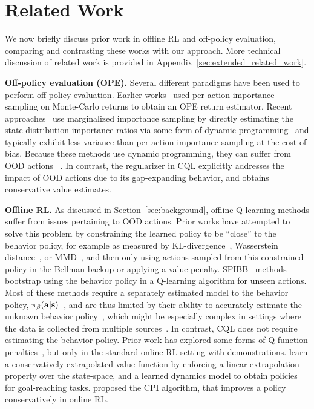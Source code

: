 \vspace{-8pt}
\section{Related Work}
\label{sec:related}
\vspace{-8pt}
We now briefly discuss prior work in offline RL and off-policy evaluation, comparing and contrasting these works with our approach. More technical discussion of related work is provided in Appendix~\ref{sec:extended_related_work}.

\textbf{Off-policy evaluation (OPE).} Several different paradigms have been used to perform off-policy evaluation. Earlier works~\citep{precup2000eligibility,peshkin2002learning,precup2001off} used per-action importance sampling on Monte-Carlo returns to obtain an OPE return estimator. Recent approaches~\citep{liu2018breaking,gelada2019off,nachum2019dualdice,Zhang2020GenDICE:} use marginalized importance sampling by directly estimating the state-distribution importance ratios via some form of dynamic programming~\citep{levine2020offline} and typically exhibit less variance than per-action importance sampling at the cost of bias. Because these methods use dynamic programming, they can suffer from OOD actions
~\citep{levine2020offline,gelada2019off,hallak2017consistent,nachum2019dualdice}. In contrast, the regularizer in CQL explicitly addresses the impact of OOD actions due to its gap-expanding behavior, and obtains conservative value estimates.

\textbf{Offline RL.} As discussed in Section~\ref{sec:background}, offline Q-learning methods suffer from issues pertaining to OOD actions. Prior works have attempted to solve this problem by constraining the learned policy to be ``close'' to the behavior policy, for example as measured by  KL-divergence~\citep{jaques2019way,wu2019behavior,peng2019awr,siegel2020keep}, Wasserstein distance~\citep{wu2019behavior}, or MMD~\citep{kumar2019stabilizing}, and then 
only using actions sampled from this constrained policy in the Bellman backup or applying a value penalty. SPIBB~\citep{laroche2017safe,nadjahi2019safe} methods bootstrap using the behavior policy in a Q-learning algorithm for unseen actions. Most of these methods require a separately estimated model to the behavior policy, ${\pi_\beta}(\mathbf{a}|\mathbf{s})$~\citep{fujimoto2018off,kumar2019stabilizing,wu2019behavior,jaques2019way,siegel2020keep,simao2019safe}, and {are thus limited by their ability to accurately estimate the unknown behavior policy~\citep{nair2020accelerating}, which might be especially complex in settings where the data is collected from multiple sources~\citep{levine2020offline}. In contrast, CQL does not require estimating the behavior policy.} Prior work has explored some forms of Q-function penalties~\citep{hester2018deep,vecerik2017leveraging}, but only in the standard online RL setting with demonstrations. \citet{luo2019learning} learn a conservatively-extrapolated value function by enforcing a linear extrapolation property over the state-space, and a learned dynamics model to obtain policies for goal-reaching tasks. \citet{kakade2002approximately} proposed the CPI algorithm, that improves a policy conservatively in online RL.

